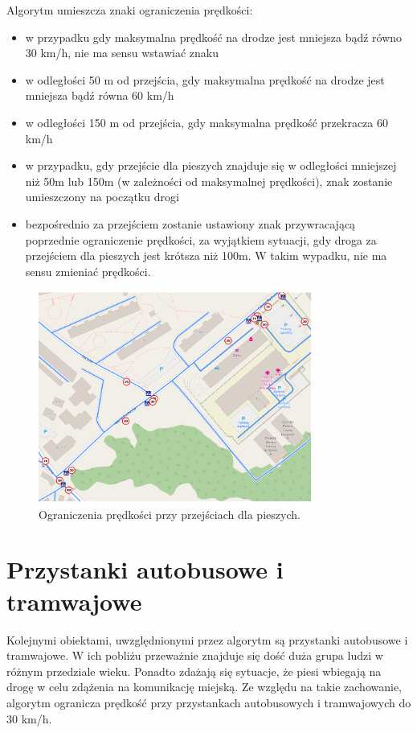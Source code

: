 Algorytm umieszcza znaki ograniczenia prędkości:
\begin{itemize}
\item w przypadku gdy maksymalna prędkość na drodze jest mniejsza bądź równo 30 km/h, nie ma sensu wstawiać znaku
\item w odległości 50 m od przejścia, gdy maksymalna prędkość na drodze jest mniejsza bądź równa 60 km/h
\item w odległości 150 m od przejścia, gdy maksymalna prędkość przekracza 60 km/h
\item w przypadku, gdy przejście dla pieszych znajduje się w odległości mniejszej niż 50m lub 150m (w zależności od maksymalnej prędkości), znak zostanie umieszczony na początku drogi
\item bezpośrednio za przejściem zostanie ustawiony znak przywracającą poprzednie ograniczenie prędkości, za wyjątkiem sytuacji, gdy droga za przejściem dla pieszych jest krótsza niż 100m. W takim wypadku, nie ma sensu zmieniać prędkości.
\end{itemize}

\begin{figure}[h]
\caption{Ograniczenia prędkości przy przejściach dla pieszych.}
\label{sec:przejsciePredkosci}
\centering
\includegraphics[width=0.8\textwidth]{pedestrian_speed}
\end{figure}

\newpage
\section{Przystanki autobusowe i tramwajowe}
\label{sec:busStopsMain}
Kolejnymi obiektami, uwzględnionymi przez algorytm są przystanki autobusowe i tramwajowe. W ich pobliżu przeważnie znajduje się dość duża grupa ludzi w różnym przedziale wieku. Ponadto zdażają się sytuacje, że piesi wbiegają na drogę w celu zdążenia na komunikację miejską. Ze względu na takie zachowanie, algorytm ogranicza prędkość przy przystankach autobusowych i tramwajowych do 30 km/h.

